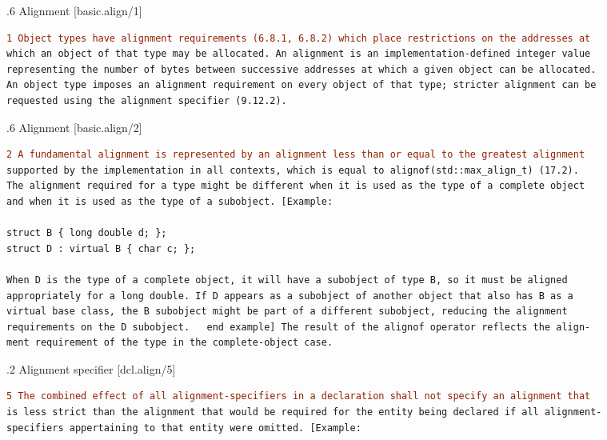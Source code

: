 \documentclass[11pt]{article}
\begin{document}
\begin{thebibliography}{5}

    \hypertarget{6.7.6/1}{}
    .6 Alignment \hspace*{0pt}\hfill [basic.align/1]
    \newline
\begin{lstlisting}[language=diff]
1 Object types have alignment requirements (6.8.1, 6.8.2) which place restrictions on the addresses at
which an object of that type may be allocated. An alignment is an implementation-defined integer value 
representing the number of bytes between successive addresses at which a given object can be allocated. 
An object type imposes an alignment requirement on every object of that type; stricter alignment can be
requested using the alignment specifier (9.12.2).
\end{lstlisting}

 \hypertarget{6.7.6/2}{}
    .6 Alignment \hspace*{0pt}\hfill [basic.align/2]
    \newline
\begin{lstlisting}[language=diff]
2 A fundamental alignment is represented by an alignment less than or equal to the greatest alignment 
supported by the implementation in all contexts, which is equal to alignof(std::max_align_t) (17.2). 
The alignment required for a type might be different when it is used as the type of a complete object 
and when it is used as the type of a subobject. [Example:

struct B { long double d; };
struct D : virtual B { char c; };

When D is the type of a complete object, it will have a subobject of type B, so it must be aligned
appropriately for a long double. If D appears as a subobject of another object that also has B as a 
virtual base class, the B subobject might be part of a different subobject, reducing the alignment 
requirements on the D subobject.   end example] The result of the alignof operator reflects the align-
ment requirement of the type in the complete-object case.
\end{lstlisting}

    
    \hypertarget{9.12.2/5}{}   
    .2 Alignment specifier \hspace*{0pt}\hfill[dcl.align/5]
    \newline
\begin{lstlisting}[language=diff]
5 The combined effect of all alignment-specifiers in a declaration shall not specify an alignment that
is less strict than the alignment that would be required for the entity being declared if all alignment-
specifiers appertaining to that entity were omitted. [Example:


\end{lstlisting}
\end{thebibliography}
\end{document}
